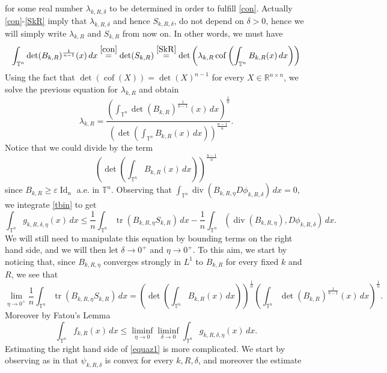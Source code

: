 \documentclass[10pt,reqno]{amsart}
\numberwithin{equation}{section}
\newcommand{\R}{\mathbb{R}}
\newcommand{\T}{\mathbb{T}}
\newcommand{\eps}{\varepsilon}
\DeclareMathOperator{\cof}{cof}
\DeclareMathOperator{\Id}{Id}
\DeclareMathOperator{\dv}{div}
\DeclareMathOperator{\tr}{tr}
\theoremstyle{plain}
\theoremstyle{definition}
\theoremstyle{remark}
\begin{document}
for some real number $\lambda_{k,R,\delta}$ to be determined in order to fulfill \eqref{con}. Actually \eqref{con}-\eqref{SkR} imply that $\lambda_{k,R,\delta}$ and hence $S_{k,R,\delta}$, do not depend on $\delta >0$, hence we will simply write $\lambda_{k,R}$ and $S_{k,R}$ from now on. In other words, we must have
\[
\int_{\T^n}\det(B_{k,R})^{\frac{1}{n - 1}}(x)\,dx \overset{\eqref{con}}{=} \det(S_{k,R}) \overset{\eqref{SkR}}{=}\det\left(\lambda_{k,R}\cof\left(\int_{\T^n}B_{k,R}(x)\,dx\right)\right)
\]
Using the fact that $\det(\cof(X)) = \det(X)^{n - 1}$ for every $X \in \R^{n\times n}$, we solve the previous equation for $\lambda_{k,R}$ and obtain
\begin{equation}\label{lam}
\displaystyle\lambda_{k,R}=\frac{\left(\int_{\T^n}\det(B_{k,R})^{\frac{1}{ n - 1}}(x)\,dx\right)^{\frac{1}{n}}}{\left(\det\left(\int_{\T^n}B_{k,R}(x)\,dx\right)\right)^{\frac{n - 1}{n}}}.
\end{equation}
Notice that we could divide by the term 
\[
\left(\det\left(\int_{\T^n}B_{k,R}(x)\,dx\right)\right)^{\frac{n - 1}{n}}
\]
since $B_{k,R} \ge \eps \Id_n$ a.e. in $\T^n$. Observing that $\int_{\T^n}\dv(B_{k,R,\eta}D \phi_{k,R,\delta})\,dx = 0$, we integrate \eqref{tbin} to get
\begin{equation}\label{equaz1}
\int_{\T^n}g_{k,R,\delta,\eta}(x)\,dx \le \frac{1}{n}\int_{\T^n}\tr(B_{k,R,\eta}S_{k,R})\,dx- \frac{1}{n}\int_{\T^n}(\dv(B_{k,R,\eta}),D\phi_{k,R,\delta})\,dx.
\end{equation}
We will still need to manipulate this equation by bounding terms on the right hand side, and we will then let $\delta \to 0^+$ and $\eta \to 0^+$. To this aim, we start by noticing that, since $B_{k,R,\eta}$ converges strongly in $L^1$ to $B_{k,R}$ for every fixed $k$ and $R$, we see that
\begin{equation}\label{limiteta}
\lim_{\eta \to 0^+}\frac{1}{n}\int_{\T^n}\tr(B_{k,R,\eta}S_{k,R})\,dx = \left(\det\left(\int_{\T^n}B_{k,R}(x)\,dx\right)\right)^{\frac{1}{n}}\left(\int_{\T^n}\det(B_{k,R})^{\frac{1}{ n - 1}}(x)\,dx\right)^{\frac{1}{n}}.
\end{equation}
Moreover by Fatou's Lemma
\begin{equation}\label{Fat1}
\int_{\T^n}f_{k,R}(x) \,dx \le \liminf_{\eta \to 0}\liminf_{\delta \to 0}\int_{\T^n}g_{k,R,\delta,\eta}(x)\,dx.
\end{equation}
Estimating the right hand side of \eqref{equaz1} is more complicated. We start by observing as in \cite[Sec. 5.2]{SER} that $\psi_{k,R,\delta}$ is convex  for every $k,R,\delta$, and moreover the estimate
\end{document}
